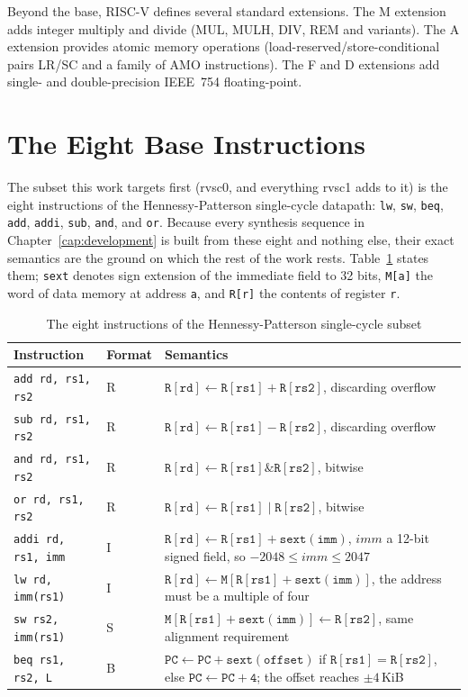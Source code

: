 Beyond the base, RISC-V defines several standard extensions. The M extension adds integer multiply and
divide (MUL, MULH, DIV, REM and variants). The A extension provides atomic memory operations
(load-reserved/store-conditional pairs LR/SC and a family of AMO instructions). The F and D extensions
add single- and double-precision IEEE~754 floating-point.

\section{The Eight Base Instructions} \label{sec:eight-base}

The subset this work targets first (rvsc0, and everything rvsc1 adds to it) is the eight instructions
of the Hennessy-Patterson single-cycle datapath: \texttt{lw}, \texttt{sw}, \texttt{beq},
\texttt{add}, \texttt{addi}, \texttt{sub}, \texttt{and}, and \texttt{or}. Because every synthesis
sequence in Chapter~\ref{cap:development} is built from these eight and nothing else, their exact
semantics are the ground on which the rest of the work rests. Table~\ref{tab:eight-base} states them;
\texttt{sext} denotes sign extension of the immediate field to 32 bits, \texttt{M[a]} the word of
data memory at address \texttt{a}, and \texttt{R[r]} the contents of register \texttt{r}.

\begin{table}[htb]
\centering
\caption{The eight instructions of the Hennessy-Patterson single-cycle subset}
\label{tab:eight-base}
\begin{tabular}{@{}llp{7.4cm}@{}}
\toprule
\textbf{Instruction} & \textbf{Format} & \textbf{Semantics} \\
\midrule
\texttt{add rd, rs1, rs2}  & R & $\mathtt{R[rd] \leftarrow R[rs1] + R[rs2]}$, discarding overflow \\
\texttt{sub rd, rs1, rs2}  & R & $\mathtt{R[rd] \leftarrow R[rs1] - R[rs2]}$, discarding overflow \\
\texttt{and rd, rs1, rs2}  & R & $\mathtt{R[rd] \leftarrow R[rs1] \mathbin{\&} R[rs2]}$, bitwise \\
\texttt{or rd, rs1, rs2}   & R & $\mathtt{R[rd] \leftarrow R[rs1] \mid R[rs2]}$, bitwise \\
\texttt{addi rd, rs1, imm} & I & $\mathtt{R[rd] \leftarrow R[rs1] + sext(imm)}$, $\mathit{imm}$ a
                                 12-bit signed field, so $-2048 \leq \mathit{imm} \leq 2047$ \\
\texttt{lw rd, imm(rs1)}   & I & $\mathtt{R[rd] \leftarrow M[R[rs1] + sext(imm)]}$, the address must
                                 be a multiple of four \\
\texttt{sw rs2, imm(rs1)}  & S & $\mathtt{M[R[rs1] + sext(imm)] \leftarrow R[rs2]}$, same alignment
                                 requirement \\
\texttt{beq rs1, rs2, L}   & B & $\mathtt{PC \leftarrow PC + sext(offset)}$ if
                                 $\mathtt{R[rs1] = R[rs2]}$, else $\mathtt{PC \leftarrow PC + 4}$;
                                 the offset reaches $\pm 4$\,KiB \\
\bottomrule
\end{tabular}
\end{table}

